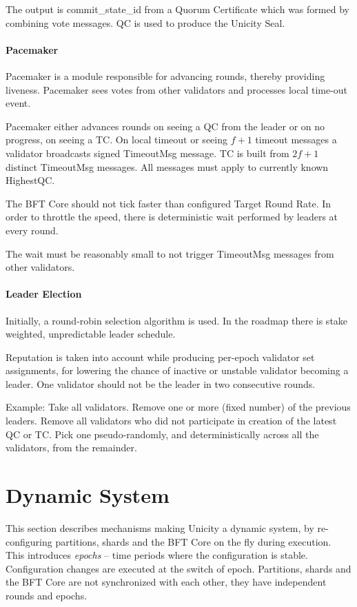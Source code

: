 The output is commit\_state\_id from a Quorum Certificate which was formed by combining vote messages. QC is used to produce the Unicity Seal.

\subsubsection{Pacemaker}

Pacemaker is a module responsible for advancing rounds, thereby providing liveness. Pacemaker sees votes from other validators and processes local time-out event.

Pacemaker either advances rounds on seeing a QC from the leader or on no progress, on seeing a TC. On local timeout or seeing $f+1$ timeout messages a validator broadcasts signed TimeoutMsg message. TC is built from $2f+1$ distinct TimeoutMsg messages. All messages must apply to currently known HighestQC.

The BFT Core should not tick faster than configured Target Round Rate. In order to throttle the speed, there is deterministic wait performed by leaders at every round.

The wait must be reasonably small to not trigger TimeoutMsg messages from other validators.


\subsubsection{Leader Election}

Initially, a round-robin selection algorithm is used. In the roadmap there is stake weighted, unpredictable leader schedule.

Reputation is taken into account while producing per-epoch validator set assignments, for lowering the chance of inactive or unstable validator becoming a leader. One validator should not be the leader in two consecutive rounds.

Example: Take all validators. Remove one or more (fixed number) of the previous leaders. Remove all validators who did not participate in creation of the latest QC or TC. Pick one pseudo-randomly, and deterministically across all the validators, from the remainder.


\chapter{Dynamic System}

This section describes mechanisms making Unicity a dynamic system, by re-configuring partitions, shards and the BFT Core on the fly during execution. This introduces \emph{epochs} -- time periods where the configuration is stable. Configuration changes are executed at the switch of epoch. Partitions, shards and the BFT Core are not synchronized with each other, they have independent rounds and epochs.

